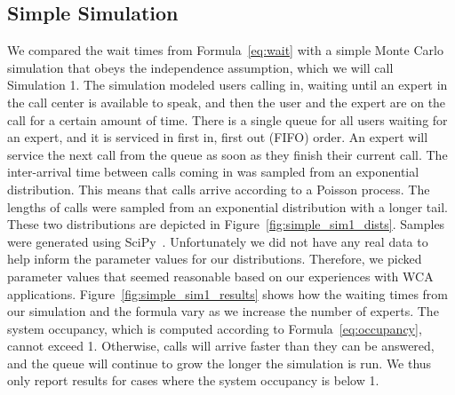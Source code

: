 \subsection{Simple Simulation}\label{sec:simple}

We compared the wait times from Formula~\ref{eq:wait} with a simple Monte Carlo
simulation that obeys the independence assumption, which we will call Simulation
1.
The simulation modeled users calling in, waiting until an expert in the
call center is available to speak, and then the user and the expert are on the
call for a certain amount of time.
There is a single queue for all users waiting for an expert, and it is serviced
in first in, first out (FIFO) order.
An expert will service the next call from the queue as soon as they finish their
current call.
The inter-arrival time between calls coming in was sampled from an exponential
distribution.
This means that calls arrive according to a Poisson process.
The lengths of calls were sampled from an exponential distribution with a longer
tail.
These two distributions are depicted in Figure~\ref{fig:simple_sim1_dists}.
Samples were generated using SciPy~\cite{scipy}.
Unfortunately we did not have any real data to help inform the parameter values
for our distributions.
Therefore, we picked parameter values that seemed reasonable based on our
experiences with WCA applications.
Figure~\ref{fig:simple_sim1_results} shows how the waiting times from our
simulation and the formula vary as we increase the number of experts.
The system occupancy, which is computed according to Formula~\ref{eq:occupancy},
cannot exceed 1.
Otherwise, calls will arrive faster than they can be answered, and the queue
will continue to grow the longer the simulation is run.
We thus only report results for cases where the system occupancy is below 1.

